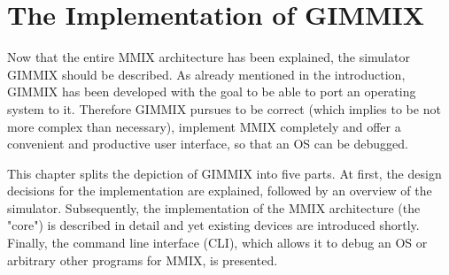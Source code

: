 \chapter{The Implementation of GIMMIX}

Now that the entire MMIX architecture has been explained, the simulator GIMMIX should be described. As already mentioned in the introduction, GIMMIX has been developed with the goal to be able to port an operating system to it. Therefore GIMMIX pursues to be correct (which implies to be not more complex than necessary), implement MMIX completely and offer a convenient and productive user interface, so that an OS can be debugged.

This chapter splits the depiction of GIMMIX into five parts. At first, the design decisions for the implementation are explained, followed by an overview of the simulator. Subsequently, the implementation of the MMIX architecture (the "core") is described in detail and yet existing devices are introduced shortly. Finally, the command line interface (CLI), which allows it to debug an OS or arbitrary other programs for MMIX, is presented.






